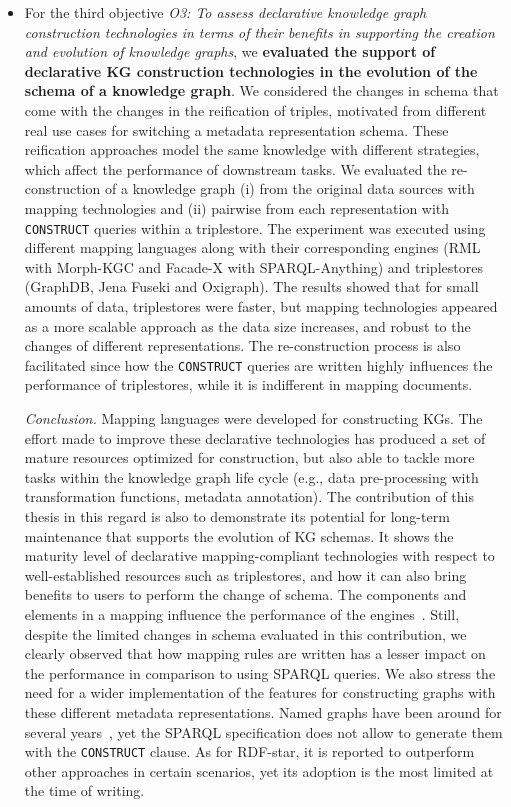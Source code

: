 \begin{itemize}
    \item For the third objective \textit{O3: To assess declarative knowledge graph construction technologies in terms of their benefits in supporting the creation and evolution of knowledge graphs}, we \textbf{evaluated the support of declarative KG construction technologies in the evolution of the schema of a knowledge graph}. 
    We considered the changes in schema that come with the changes in the reification of triples, motivated from different real use cases for switching a metadata representation schema. These reification approaches model the same knowledge with different strategies, which affect the performance of downstream tasks. 
    We evaluated the re-construction of a knowledge graph (i) from the original data sources with mapping technologies and (ii) pairwise from each representation with \texttt{CONSTRUCT} queries within a triplestore. The experiment was executed using different mapping languages along with their corresponding engines (RML with Morph-KGC and Facade-X with SPARQL-Anything) and triplestores (GraphDB, Jena Fuseki and Oxigraph). 
    The results showed that for small amounts of data, triplestores were faster, but mapping technologies appeared as a more scalable approach as the data size increases, and robust to the changes of different representations. 
    The re-construction process is also facilitated since how the \texttt{CONSTRUCT} queries are written highly influences the performance of triplestores, while it is indifferent in mapping documents. 

    \textit{Conclusion.} Mapping languages were developed for constructing KGs. The effort made to improve these declarative technologies has produced a set of mature resources optimized for construction, but also able to tackle more tasks within the knowledge graph life cycle (e.g., data pre-processing with transformation functions, metadata annotation). The contribution of this thesis in this regard is also to demonstrate its potential for long-term maintenance that supports the evolution of KG schemas. It shows the maturity level of declarative mapping-compliant technologies with respect to well-established resources such as triplestores, and how it can also bring benefits to users to perform the change of schema.
    The components and elements in a mapping influence the performance of the engines~\parencite{chaves2019parameters}. 
    Still, despite the limited changes in schema evaluated in this contribution, we clearly observed that how mapping rules are written has a lesser impact on the performance in comparison to using SPARQL queries. 
    We also stress the need for a wider implementation of the features for constructing graphs with these different metadata representations. Named graphs have been around for several years~\parencite{sparql2008}, yet the SPARQL specification does not allow to generate them with the \texttt{CONSTRUCT} clause. As for RDF-star, it is reported to outperform other approaches in certain scenarios, yet its adoption is the most limited at the time of writing. 
\end{itemize}

